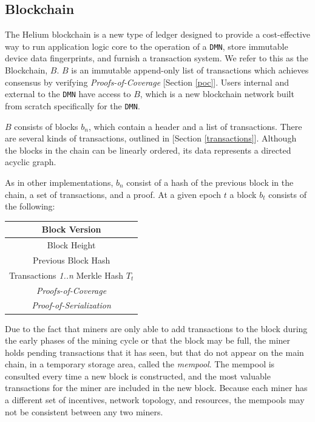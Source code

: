 \documentclass[10pt, nonatbib, nocopyrightspace, reprint]{sigplanconf}
\begin{document}
\subsection{Blockchain} \label{blockchain}

The Helium blockchain is a new type of ledger designed to provide a cost-effective way to run application logic core to the operation of a \verb|DMN|, store immutable device data fingerprints, and furnish a transaction system. We refer to this as the Blockchain, $B$. $B$ is an immutable append-only list of transactions which achieves consensus by verifying \emph{Proofs-of-Coverage} [Section \ref{poc}]. Users internal and external to the \verb|DMN| have access to $B$, which is a new blockchain network built from scratch specifically for the \verb|DMN|.

$B$ consists of blocks $b_n$, which contain a header and a list of transactions. There are several kinds of transactions, outlined in [Section \ref{transactions}]. Although the blocks in the chain can be linearly ordered, its data represents a directed acyclic graph.

As in other implementations, $b_n$ consist of a hash of the previous block in the chain, a set of transactions, and a proof. At a given epoch $t$ a block $b_t$ consists of the following:

\begin{center}
    \begin{tabular}{|c|}
         \hline
         Block Version \\
         \hline
         Block Height \\
         \hline
         Previous Block Hash \\
         \hline
         Transactions \emph{1..n} Merkle Hash $T_t$ \\
         \hline
         \emph{Proofs-of-Coverage} \\
         \hline
         \emph{Proof-of-Serialization} \\
         \hline
    \end{tabular}
\end{center}

Due to the fact that miners are only able to add transactions to the block during the early phases of the mining cycle or that the block may be full, the miner holds pending transactions that it has seen, but that do not appear on the main chain, in a temporary storage area, called the \emph{mempool}. The mempool is consulted every time a new block is constructed, and the most valuable transactions for the miner are included in the new block. Because each miner has a different set of incentives, network topology, and resources, the mempools may not be consistent between any two miners.
\end{document}
